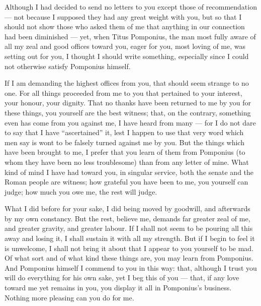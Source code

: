 

 Although I had decided to send no letters to you except those of recommendation --- not because I supposed they had any great weight with you, but so that I should not show those who asked them of me that anything in our connection had been diminished --- yet, when Titus Pomponius, the man most fully aware of all my zeal and good offices toward you, eager for you, most loving of me, was setting out for you, I thought I should write something, especially since I could not otherwise satisfy Pomponius himself.

 If I am demanding the highest offices from you, that should seem strange to no one. For all things proceeded from me to you that pertained to your interest, your honour, your dignity. That no thanks have been returned to me by you for these things, you yourself are the best witness; that, on the contrary, something even has come from you against me, I have heard from many --- for I do not dare to say that I have ``ascertained'' it, lest I happen to use that very word which men say is wont to be falsely turned against me by you. But the things which have been brought to me, I prefer that you learn of them from Pomponius (to whom they have been no less troublesome) than from any letter of mine. What kind of mind I have had toward you, in singular service, both the senate and the Roman people are witness; how grateful you have been to me, you yourself can judge; how much you owe me, the rest will judge.

 What I did before for your sake, I did being moved by goodwill, and afterwards by my own constancy. But the rest, believe me, demands far greater zeal of me, and greater gravity, and greater labour. If I shall not seem to be pouring all this away and losing it, I shall sustain it with all my strength. But if I begin to feel it is unwelcome, I shall not bring it about that I appear to you yourself to be mad. Of what sort and of what kind these things are, you may learn from Pomponius. And Pomponius himself I commend to you in this way: that, although I trust you will do everything for his own sake, yet I beg this of you --- that, if any love toward me yet remains in you, you display it all in Pomponius's business. Nothing more pleasing can you do for me.
